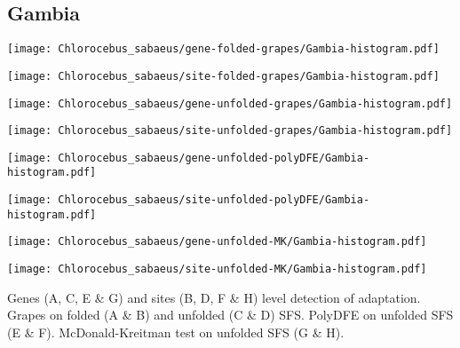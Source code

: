 \documentclass{article}
\begin{document}
\pagebreak
\subsection{Gambia}
\centering
\begin{minipage}{0.49\linewidth}
    \texttt{[image: Chlorocebus\_sabaeus/gene-folded-grapes/Gambia-histogram.pdf]}
\end{minipage}%
\hfill
\begin{minipage}{0.49\linewidth}
    \texttt{[image: Chlorocebus\_sabaeus/site-folded-grapes/Gambia-histogram.pdf]}
\end{minipage}
\hfill
\begin{minipage}{0.49\linewidth}
    \texttt{[image: Chlorocebus\_sabaeus/gene-unfolded-grapes/Gambia-histogram.pdf]}
\end{minipage}%
\hfill
\begin{minipage}{0.49\linewidth}
    \texttt{[image: Chlorocebus\_sabaeus/site-unfolded-grapes/Gambia-histogram.pdf]}
\end{minipage}
\hfill
\begin{minipage}{0.49\linewidth}
    \texttt{[image: Chlorocebus\_sabaeus/gene-unfolded-polyDFE/Gambia-histogram.pdf]}
\end{minipage}%
\hfill
\begin{minipage}{0.49\linewidth}
    \texttt{[image: Chlorocebus\_sabaeus/site-unfolded-polyDFE/Gambia-histogram.pdf]}
\end{minipage}
\hfill
\begin{minipage}{0.49\linewidth}
    \texttt{[image: Chlorocebus\_sabaeus/gene-unfolded-MK/Gambia-histogram.pdf]}
\end{minipage}%
\hfill
\begin{minipage}{0.49\linewidth}
    \texttt{[image: Chlorocebus\_sabaeus/site-unfolded-MK/Gambia-histogram.pdf]}
\end{minipage}
\hfill
\flushleft
Genes (A, C, E \& G) and sites (B, D, F \& H) level detection of adaptation.
Grapes on folded (A \& B) and unfolded (C \& D) SFS.
PolyDFE on unfolded SFS (E \& F).
McDonald-Kreitman test on unfolded SFS (G \& H).
\end{document}
